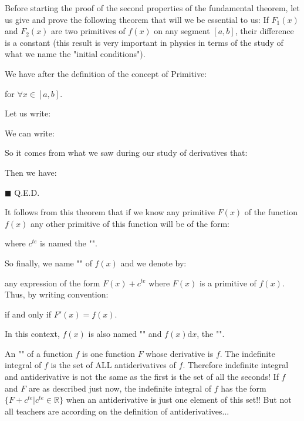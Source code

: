 	Before starting the proof of the second properties of the fundamental theorem, let us give and prove the following theorem that will we be essential to us: If $F_1(x)$ and $F_2(x)$ are two primitives of $f(x)$ on any segment $[a, b]$, their difference is a constant (this result is very important in physics in terms of the study of what we name the "initial conditions").
	\begin{dem}
	We have after the definition of the concept of Primitive:
	
	for $\forall x \in [a,b]$.
	
	Let us write:
	
	We can write:
	
	So it comes from what we saw during our study of derivatives that:
	
	Then we have:
	
	\begin{flushright}
		$\blacksquare$  Q.E.D.
	\end{flushright}
	\end{dem}
	It follows from this theorem that if we know any primitive $F (x)$ of the function $f (x)$ any other primitive of this function will be of the form:
	
	where $c^{te}$ is named the "\label{constant of integration}".
	
	So finally, we name "" of $f (x)$ and we denote by:
	
	any expression of the form $F (x)+c^{te}$ where $F(x)$ is a primitive of $f(x)$. Thus, by writing convention:
	
	if and only if $F'(x)=f(x)$.
	
	In this context, $f (x)$ is also named "" and $f (x) \mathrm{d}x$, the "".
	\begin{tcolorbox}[title=Remark,colframe=black,arc=10pt]
	An "" of a function $f$ is one function $F$ whose derivative is $f$. The indefinite integral of $f$ is the set of ALL antiderivatives of $f$. Therefore indefinite integral and antiderivative is not the same as the first is the set of all the seconds! If $f$ and $F$ are as described just now, the indefinite integral of $f$ has the form $\{F+c^{te}|c^{te}\in\mathbb{R}\}$ when an antiderivative is just one element of this set!! But not all teachers are according on the definition of antiderivatives...
	\end{tcolorbox}
	
